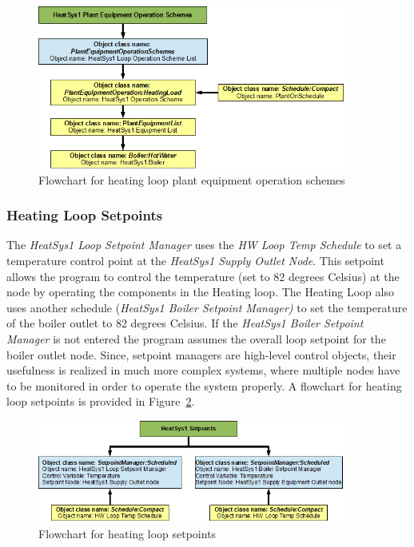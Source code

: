 \begin{figure}[hbtp] %
\centering
\includegraphics[width=0.9\textwidth, height=0.9\textheight, keepaspectratio=true]{media/image084.png}
\caption{Flowchart for heating loop plant equipment operation schemes \protect \label{fig:flowchart-for-heating-loop-plant-equipment-operation}}
\end{figure}

\subsubsection{Heating Loop Setpoints}\label{heating-loop-setpoints}

The \emph{HeatSys1 Loop Setpoint Manager} uses the \emph{HW Loop Temp Schedule} to set a temperature control point at the \emph{HeatSys1 Supply Outlet Node}. This setpoint allows the program to control the temperature (set to 82 degrees Celsius) at the node by operating the components in the Heating loop. The Heating Loop also uses another schedule (\emph{HeatSys1 Boiler Setpoint Manager)} to set the temperature of the boiler outlet to 82 degrees Celsius. If the \emph{HeatSys1 Boiler Setpoint Manager} is not entered the program assumes the overall loop setpoint for the boiler outlet node. Since, setpoint managers are high-level control objects, their usefulness is realized in much more complex systems, where multiple nodes have to be monitored in order to operate the system properly. A flowchart for heating loop setpoints is provided in Figure~\ref{fig:flowchart-for-heating-loop-setpoints}.

\begin{figure}[hbtp] %
\centering
\includegraphics[width=0.9\textwidth, height=0.9\textheight, keepaspectratio=true]{media/image085.png}
\caption{Flowchart for heating loop setpoints \protect \label{fig:flowchart-for-heating-loop-setpoints}}
\end{figure}

